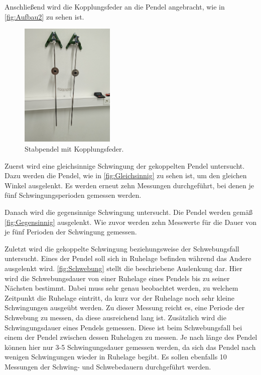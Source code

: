 Anschließend wird die Kopplungsfeder an die Pendel angebracht, wie in \autoref{fig:Aufbau2} zu sehen ist. 
\begin{figure}
    \centering
    \includegraphics[width=0.4\textwidth]{content/Gekoppelt.jpg}
	\caption{Stabpendel mit Kopplungsfeder.}
	\label{fig:Aufbau2}
\end{figure}
Zuerst wird eine gleichsinnige Schwingung der gekoppelten Pendel untersucht. Dazu werden die Pendel, wie in \autoref{fig:Gleichsinnig} zu sehen ist, um den gleichen Winkel ausgelenkt.
Es werden erneut zehn Messungen durchgeführt, bei denen je fünf Schwingungsperioden gemessen werden.

Danach wird die gegensinnige Schwingung untersucht. Die Pendel werden gemäß \autoref{fig:Gegensinnig} ausgelenkt. Wie zuvor werden zehn Messwerte für die Dauer von je fünf Perioden der
Schwingung gemessen.


Zuletzt wird die gekoppelte Schwingung beziehungsweise der Schwebungsfall untersucht. Eines der Pendel soll sich in Ruhelage befinden während das Andere ausgelenkt wird. 
\autoref{fig:Schwebung} stellt die beschriebene Auslenkung dar. Hier wird die Schwebungsdauer von einer Ruhelage eines Pendels bis zu seiner Nächsten bestimmt. Dabei muss sehr
genau beobachtet werden, zu welchem Zeitpunkt die Ruhelage eintritt, da kurz vor der Ruhelage noch sehr kleine Schwingungen ausgeübt werden. Zu dieser Messung reicht es, eine Periode der Schwebung
zu messen, da diese ausreichend lang ist. Zusätzlich wird die Schwingungsdauer eines Pendels gemessen. Diese ist beim Schwebungsfall bei einem der Pendel zwischen dessen Ruhelagen zu messen. Je nach länge 
des Pendel können hier nur 3-5 Schwingungsdauer gemessen werden, da sich das Pendel nach wenigen Schwingungen wieder in Ruhelage begibt. Es sollen ebenfalls 10 Messungen der Schwing- und Schwebedauern
durchgeführt werden. 